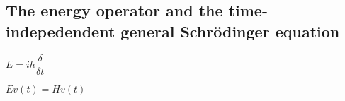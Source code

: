
\subsection{The energy operator and the time-indepedendent general Schrödinger equation}

\(E=ih\dfrac{\delta }{\delta t}\)

\(Ev(t)=Hv(t)\)

